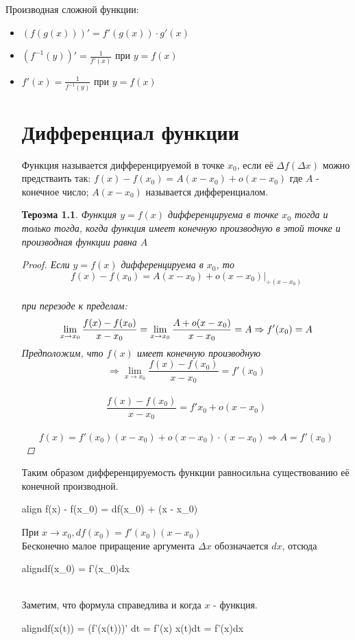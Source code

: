 \documentclass[oneside]{book}
\newcommand{\boxedeq}[2]{\begin{empheq}[box={\fboxsep=6pt\fbox}]{align}\label{#1}#2\end{empheq}}
\newtheorem{thm}{Тероэма}[chapter] %
\begin{document}
Производная сложной функции:
\begin{itemize}
  \item $(f(g(x)))' = f'(g(x)) \cdot g'(x)$
  \item $(f^{-1}(y))' = \frac{1}{f'(x)}$ при $y = f(x)$
  \item $f'(x) = \frac{1}{f^{-1}(y)}$ при $y = f(x)$


    \setcounter{chapter}{19}
    \chapter{Дифференциал функции}

Функция называется дифференцируемой в точке $x_0$, если её $\Delta f(\Delta x)$ можно предстваить так:
$f(x) - f(x_0) = A(x - x_0) + o(x - x_0)$ где $A$ - конечное число; $A(x - x_0)$ называется дифференциалом.
\begin{thm}
    Функция $y = f(x)$ дифференцируема в точке $x_0$ тогда и только тогда, когда функция имеет конечную производную в этой точке
    и производная функции равна $A$
    \begin{proof}
      Если $y = f(x)$ дифференцируема в $x_0$, то
      $$f(x) - f(x_0) = A(x-x_0) + o(x - x_0)\vert_{\div (x - x_0)}$$ \\
      при перезоде к пределам:
      $$\lim_{x \rightarrow x_0}{\frac{f(x) - f(x_0)}{x - x_0}} = \lim_{x \rightarrow x_0}{\frac{A+o(x-x_0)}{x-x_0}} = \large{A} \Rightarrow f'(x_0) = A$$
		Предположим, что $f(x)$ имеет конечную производную $$ \Rightarrow \lim_{x \rightarrow x_0}{\frac{f(x) - f(x_0)}{x - x_0}} =
		f'(x_0)$$ \\
		$$\frac{f(x) - f(x_0)}{x - x_0} = f'{x_0} + o(x-x_0)$$ \\ $$
		f(x) = f'(x_0)(x - x_0) + o(x-x_0) \cdot (x-x_0) \Rightarrow A = f'(x_0)$$
    \end{proof}
\end{thm}
Таким образом дифференцируемость функции равносильна существованию её конечной производной.
\boxedeq{eq:*}{ f(x) - f(x_0) = df(x_0) + (x - x_0)}
При $x \rightarrow x_0, df(x_0) = f'(x_0)(x - x_0)$ \\
Бесконечно малое приращение аргумента $\Delta x$ обозначается $dx$, отсюда
\boxedeq{eq:*}{df(x_0) = f'(x_0)dx} \\

Заметим, что формула справедлива и когда $x$ - функция.
\boxedeq{eq:*}{df(x(t)) = (f'(x(t)))' dt = f'(x) \cdot x(t)dt = f'(x)dx}


\end{itemize}
\end{document}
